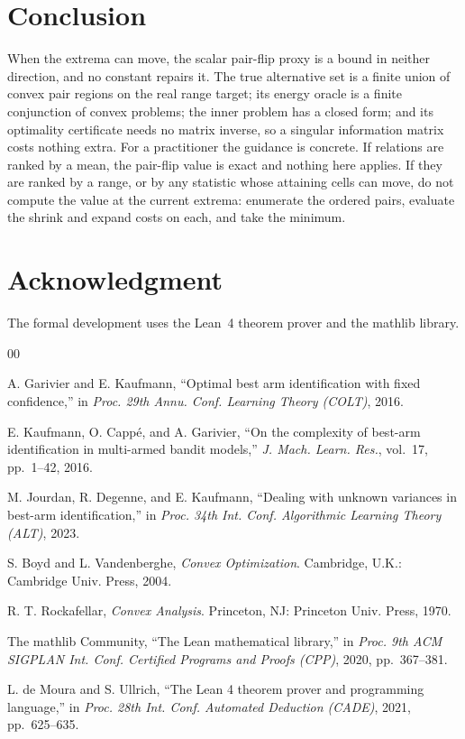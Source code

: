 \documentclass[conference]{IEEEtran}
\theoremstyle{definition}
\begin{document}
\section{Conclusion}

When the extrema can move, the scalar pair-flip proxy is a bound in neither direction, and no
constant repairs it. The true alternative set is a finite union of convex pair regions on the
real range target; its energy oracle is a finite conjunction of convex problems; the inner
problem has a closed form; and its optimality certificate needs no matrix inverse, so a
singular information matrix costs nothing extra. For a practitioner the guidance is concrete.
If relations are ranked by a mean, the pair-flip value is exact and nothing here applies. If
they are ranked by a range, or by any statistic whose attaining cells can move, do not compute
the value at the current extrema: enumerate the ordered pairs, evaluate the shrink and expand
costs on each, and take the minimum.

\section*{Acknowledgment}

The formal development uses the Lean~4 theorem prover and the mathlib library.

\begin{thebibliography}{00}

 A. Garivier and E. Kaufmann, ``Optimal best arm identification with
fixed confidence,'' in \emph{Proc. 29th Annu. Conf. Learning Theory (COLT)}, 2016.

 E. Kaufmann, O. Capp\'e, and A. Garivier, ``On the complexity of
best-arm identification in multi-armed bandit models,'' \emph{J. Mach. Learn. Res.},
vol.~17, pp.~1--42, 2016.

 M. Jourdan, R. Degenne, and E. Kaufmann, ``Dealing with unknown
variances in best-arm identification,'' in \emph{Proc. 34th Int. Conf. Algorithmic Learning
Theory (ALT)}, 2023.

 S. Boyd and L. Vandenberghe, \emph{Convex Optimization}. Cambridge,
U.K.: Cambridge Univ. Press, 2004.

 R. T. Rockafellar, \emph{Convex Analysis}. Princeton, NJ:
Princeton Univ. Press, 1970.

 The mathlib Community, ``The Lean mathematical library,'' in
\emph{Proc. 9th ACM SIGPLAN Int. Conf. Certified Programs and Proofs (CPP)}, 2020,
pp.~367--381.

 L. de Moura and S. Ullrich, ``The Lean 4 theorem prover and
programming language,'' in \emph{Proc. 28th Int. Conf. Automated Deduction (CADE)}, 2021,
pp.~625--635.

\end{thebibliography}


\end{document}
